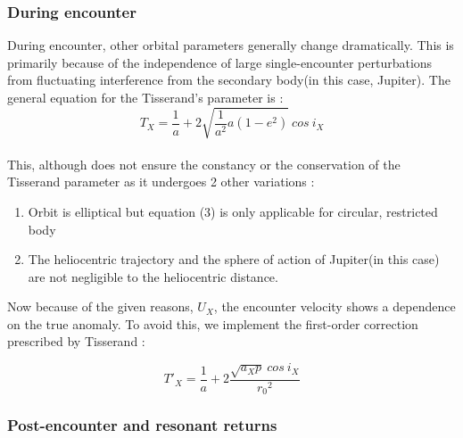 \documentclass{article}
\begin{document}
\subsubsection{During encounter}
During encounter, other orbital parameters generally change dramatically. This is primarily because of the independence of large single-encounter perturbations from fluctuating interference from the secondary body(in this case, Jupiter). The general equation for the Tisserand's parameter is : 
\begin{equation}
    T_X = \frac{1}{a} + 2\sqrt{\frac{1}{a^2}a(1-e^2)}\ cos\ i_X
\end{equation}
\\ This, although does not ensure the constancy or the conservation of the Tisserand parameter as it undergoes 2 other variations : 
\begin{enumerate}
    \item Orbit is elliptical but equation (3) is only applicable for circular, restricted body
    \item The heliocentric trajectory and the sphere of action of Jupiter(in this case) are not negligible to the heliocentric distance.
\end{enumerate}
 \newpage     
   Now because of the given reasons, $U_X$, the encounter velocity shows a dependence on the true anomaly. To avoid this, we implement the first-order correction prescribed by Tisserand : 

   \begin{equation}
       T'_X = \frac{1}{a} + 2 \frac{\sqrt{a_X p}\ cos\ i_X}{{r_0}^2}
   \end{equation}
\subsubsection{Post-encounter and resonant returns}


\hspace{10cm}
\end{document}
